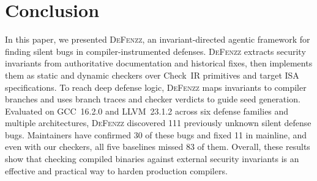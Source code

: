 \documentclass[conference,compsoc]{IEEEtran}
\begin{document}
\section{Conclusion}\label{sec:conclusion}

In this paper, we presented \textsc{DeFenzz}, an invariant-directed agentic framework for finding silent bugs in compiler-instrumented defenses. \textsc{DeFenzz} extracts security invariants from authoritative documentation and historical fixes, then implements them as static and dynamic checkers over Check~IR primitives and target ISA specifications. To reach deep defense logic, \textsc{DeFenzz} maps invariants to compiler branches and uses branch traces and checker verdicts to guide seed generation. Evaluated on GCC~16.2.0 and LLVM~23.1.2 across six defense families and multiple architectures, \textsc{DeFenzz} discovered 111 previously unknown silent defense bugs. Maintainers have confirmed 30 of these bugs and fixed 11 in mainline, and even with our checkers, all five baselines missed 83 of them. Overall, these results show that checking compiled binaries against external security invariants is an effective and practical way to harden production compilers.



\end{document}
